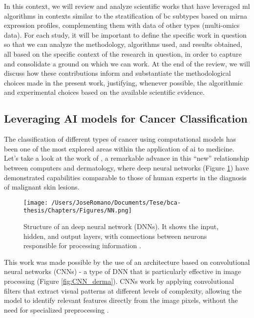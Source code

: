 In this context, we will review and analyze scientific works that have
leveraged \gls{ml} algorithms in contexts similar to the stratification of
\gls{bc} subtypes based on \gls{mirna} expression profiles, complementing them
with data of other types (multi-omics data). For each study, it will be
important to define the specific work in question so that we can analyze the
methodology, algorithms used, and results obtained, all based on the specific
context of the research in question, in order to capture and consolidate a
ground on which we can work. At the end of the review, we will discuss how
these contributions inform and substantiate the methodological choices made in
the present work, justifying, whenever possible, the algorithmic and
experimental choices based on the available scientific evidence.

\subsection{Leveraging AI models for Cancer Classification}

The classification of different types of cancer using computational models has
been one of the most explored areas within the application of \gls{ai} to
medicine. Let's take a look at the work of
\textcite{ai_in_dermacancer_esteva2017}, a remarkable advance in this “new”
relationship between computers and dermatology, where deep neural networks
(Figure \ref{fig:DNN}) have demonstrated capabilities comparable to those of
human experts in the diagnosis of malignant skin lesions.

\begin{figure}[htbp]
  \centering
  \texttt{[image: /Users/JoseRomano/Documents/Tese/bca-thesis/Chapters/Figures/NN.png]}
  \caption{Structure of an deep neural network (DNNs). It shows the input, hidden, and output layers, with connections between neurons responsible for processing information \cite{analyticsvidhya_image}.}
  \label{fig:DNN}
\end{figure}

This work was made possible by the use of an architecture based on
convolutional neural networks (CNNs) - a type of DNN that is particularly
effective in image processing (Figure \ref{fig:CNN_derma}). CNNs work by
applying convolutional filters that extract visual patterns at different levels
of complexity, allowing the model to identify relevant features directly from
the image pixels, without the need for specialized preprocessing
\cite{CNN_Albawi2017}.

